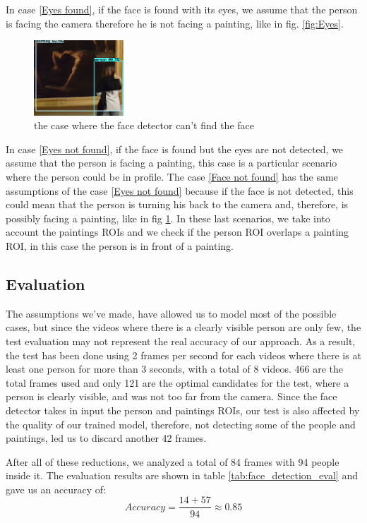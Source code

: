 In case \ref*{Eyes found}, if the face is found with its eyes, we assume that the person is facing the camera therefore he is not facing a painting, like in fig. \ref{fig:Eyes}.
\begin{figure}[h!]
    \centering
    \includegraphics[width=0.3\textwidth]{pictures/face_detection/face_det1}
    \caption{the case where the face detector can't find the face}
    \label{fig:No_eyes}
\end{figure}
In case \ref*{Eyes not found}, if the face is found but the eyes are not detected, we assume that the person is facing a painting, this case is a particular scenario where the person could be in profile. The case \ref*{Face not found} has the same assumptions of the case \ref*{Eyes not found} because if the face is not detected, this could mean that the person is turning his back to the camera and, therefore, is possibly facing a painting, like in fig \ref{fig:No_eyes}. In these last scenarios, we take into account the paintings ROIs and we check if the person ROI overlaps a painting ROI, in this case the person is in front of a painting.

\subsection{Evaluation}
The assumptions we've made, have allowed us to model most of the possible cases, but since the videos where there is a clearly visible person are only few, the test evaluation may not represent the real accuracy of our approach. As a result, the test has been done using 2 frames per second for each videos where there is at least one person for more than 3 seconds, with a total of 8 videos. 466 are the total frames used and only 121 are the optimal candidates for the test, where a person is clearly visible, and was not too far from the camera. Since the face detector takes in input the person and paintings ROIs, our test is also affected by the quality of our trained model, therefore, not detecting some of the people and paintings, led us to discard another 42 frames.

After all of these reductions, we analyzed a total of 84 frames with 94 people inside it. The evaluation results are shown in table \ref{tab:face_detection_eval} and gave us an accuracy of: \[Accuracy = \frac{14+57}{94} \approx 0.85\]

